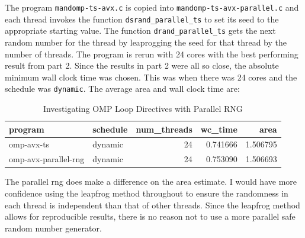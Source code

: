 \documentclass{article}
\begin{document}
The program \texttt{mandomp-ts-avx.c} is copied into \texttt{mandomp-ts-avx-parallel.c} and each thread 
invokes the function \texttt{dsrand\_parallel\_ts} to set its seed to the appropriate starting value. The function 
\texttt{drand\_parallel\_ts} gets the next random number for the thread by leaprogging the seed for that thread 
by the number of threads. The program is rerun with 24 cores with the best performing result from part 2. 
Since the results in part 2 were all so close, the absolute minimum wall clock time was chosen. 
This was when there was 24 cores and the schedule was \texttt{dynamic}. The average area and wall clock time are:
\begin{table}[H]
    \centering
    \caption{Investigating OMP Loop Directives with Parallel RNG}
    \fontsize{12}{14}\selectfont
    \begin{tabular}[t]{l|l|r|r|r}
    \hline
    program & schedule & num\_threads & wc\_time & area\\
    \hline
    omp-avx-ts & dynamic & 24 & 0.741666 & 1.506795\\
    \hline
    omp-avx-parallel-rng & dynamic & 24 & 0.753090 & 1.506693\\
    \hline
    \end{tabular}
\end{table}
\noindent The parallel rng does make a difference on the area estimate. I would 
have more confidence using the leapfrog method throughout to ensure the randomness 
in each thread is independent than that of other threads. Since the leapfrog method allows 
for reproducible results, there is no reason not to use a more parallel safe random number generator.
\end{document}
